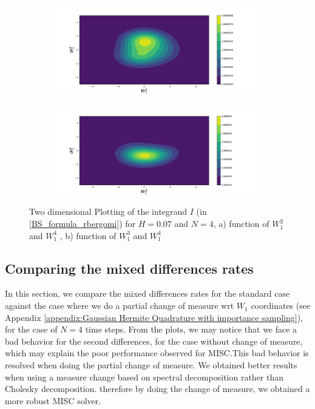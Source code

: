 \documentclass[11pt]{article}
\begin{document}
\begin{figure}[h!]
	\centering
	\begin{subfigure}{.45\textwidth}
		\centering
		\includegraphics[width=1\linewidth]{./figures/integrand_plotting_rBergomi/2D_plots/N_4/H_007/Bergomi_integrand_contours_K_1_H_007_W1_2_4_N_4}
		\caption{}
		\label{fig:sub3}
	\end{subfigure}%
	\begin{subfigure}{.45\textwidth}
		\centering
		\includegraphics[width=1\linewidth]{./figures/integrand_plotting_rBergomi/2D_plots/N_4/H_007/Bergomi_integrand_contours_K_1_H_007_W1_3_4_N_4}
		\caption{}
		\label{fig:sub4}
	\end{subfigure}
	\caption{Two dimensional Plotting of the integrand $I$ (in \eqref{BS_formula_rbergomi})  for $H=0.07$ and $N=4$, a)  function of $W_1^2$ and $W_1^4$ , b) function of $W_1^3$ and $W_1^4$ }
	\label{fig:Integrand_H_007_N_4_2D_W_1_3_3_4}
\end{figure}


\newpage
\subsection{Comparing the mixed differences rates}
In this section, we compare the mixed differences rates for the standard case against the case where we do a partial change of measure wrt $W_1$ coordinates (see Appendix \ref{appendix:Gaussian Hermite Quadrature with importance sampling}), for the case of $N=4$ time steps. From the plots, we may notice that we face a bad behavior for the second differences, for the case without change of measure, which may explain the poor performance observed for MISC.This bad behavior is resolved when doing the partial change of measure. We obtained better results when using a measure change based on spectral decomposition rather than Cholesky decomposition. therefore by doing the change of measure, we obtained a more robust MISC solver.
\end{document}
